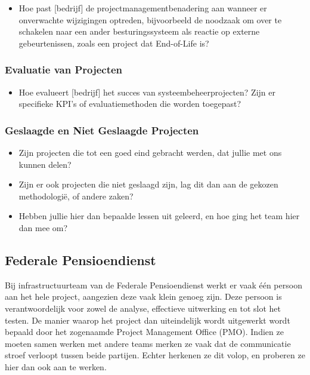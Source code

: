 \documentclass[dutch]{hogent-article}
\begin{document}
\begin{itemize}
    \item Hoe past [bedrijf] de projectmanagementbenadering aan wanneer er onverwachte wijzigingen optreden, bijvoorbeeld de noodzaak om over te schakelen naar een ander besturingssysteem als reactie op externe gebeurtenissen, zoals een project dat End-of-Life is?
\end{itemize}

\subsubsection{Evaluatie van Projecten}
\label{ssec:evaluatie-van-projecten}

\begin{itemize}
    \item Hoe evalueert [bedrijf] het succes van systeembeheerprojecten? Zijn er specifieke KPI's of evaluatiemethoden die worden toegepast?
\end{itemize}

\subsubsection{Geslaagde en Niet Geslaagde Projecten}
\label{ssec:geslaagde-en-niet-geslaagde-projecten}

\begin{itemize}
    \item Zijn projecten die tot een goed eind gebracht werden, dat jullie met ons kunnen delen?
    \item Zijn er ook projecten die niet geslaagd zijn, lag dit dan aan de gekozen methodologië, of andere zaken?
    \item Hebben jullie hier dan bepaalde lessen uit geleerd, en hoe ging het team hier dan mee om?
\end{itemize}

\subsection{Federale Pensioendienst}
\label{ssec:interview-fpd}

Bij infrastructuurteam van de Federale Pensioendienst werkt er vaak \'e\'en persoon aan het hele project, aangezien deze vaak klein genoeg zijn. Deze persoon is verantwoordelijk voor zowel de analyse, effectieve uitwerking en tot slot het testen. De manier waarop het project dan uiteindelijk wordt uitgewerkt wordt bepaald door het zogenaamde Project Management Office (PMO).
\newline
    Indien ze moeten samen werken met andere teams merken ze vaak dat de communicatie stroef verloopt tussen beide partijen. Echter herkenen ze dit volop, en proberen ze hier dan ook aan te werken.
\newline
\end{document}
